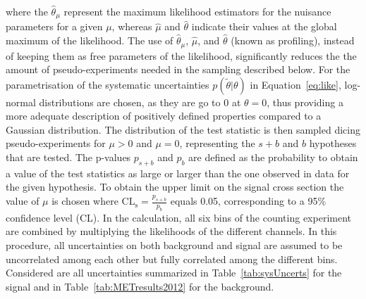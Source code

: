 where the $\hat{\theta}_\mu$ represent the maximum likelihood estimators for the nuisance parameters for a given $\mu$, whereas $\hat{\mu}$ and $\hat{\theta}$ indicate their values at the global maximum of the likelihood. The use of $\hat{\theta}_\mu$, $\hat{\mu}$, and $\hat{\theta}$ (known as profiling), instead of keeping them as free parameters of the likelihood, significantly reduces the the amount of pseudo-experiments needed in the sampling described below. For the parametrisation of the systematic uncertainties $p\left(\tilde{\theta}|\theta\right)$ in Equation~\ref{eq:like}, log-normal distributions are chosen, as they are go to 0 at $\theta = 0$, thus providing a more adequate description of positively defined properties compared to a Gaussian distribution. The distribution of the test statistic is then sampled dicing pseudo-experiments for $\mu > 0$ and $\mu = 0$, representing the $s+b$ and $b$ hypotheses that are tested. The p-values $p_{s+b}$ and $p_{b}$ are defined as the probability to obtain a value of the test statistics as large or larger than the one observed in data for the given hypothesis. To obtain the upper limit on the signal cross section the value of $\mu$ is chosen where $\mathrm{CL}_{\mathrm{s}} = \frac{p_{s+b}}{p_b}$ equals 0.05, corresponding to a 95\% confidence level (CL). In the calculation, all six bins of the counting experiment are combined by multiplying the likelihoods of the different channels. In this procedure, all uncertainties on both background and signal are assumed to be uncorrelated among each other but fully correlated among the different bins. Considered are all uncertainties summarized in Table~\ref{tab:sysUncerts} for the signal and in Table~\ref{tab:METresults2012} for the background.

